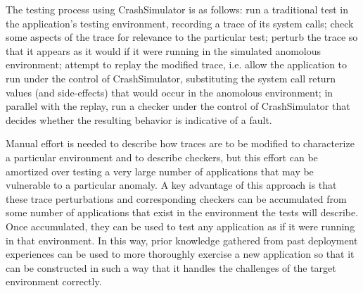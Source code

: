 The testing process using CrashSimulator is as follows:
	run a traditional test in the application's testing environment, recording a trace of its system calls;
	check some aspects of the trace for relevance to the particular test;
		perturb the trace so that it appears as it would if it were running in the simulated anomolous environment;
		attempt to replay the modified trace, i.e. allow the application to run under the control of CrashSimulator, substituting the system call return values (and side-effects) that would occur in the anomolous environment;
		in parallel with the replay, run a checker under the control of CrashSimulator that decides whether the resulting behavior is indicative of a fault.

Manual effort is needed to describe how traces are to be modified to characterize a particular environment and to describe checkers, but this effort can be amortized over testing a very large number of applications that may be vulnerable to a particular anomaly.
%
%
%
A key advantage of this approach is that these %
trace perturbations and corresponding checkers can be
accumulated from some number of applications that exist in the environment the tests will describe.  Once accumulated,
they can be used to test any application as if it were running in that environment.  In this way, prior knowledge
gathered from past deployment experiences can be used to more thoroughly exercise a new application so that it can be
constructed in such a way that it handles the challenges of the target environment correctly.

